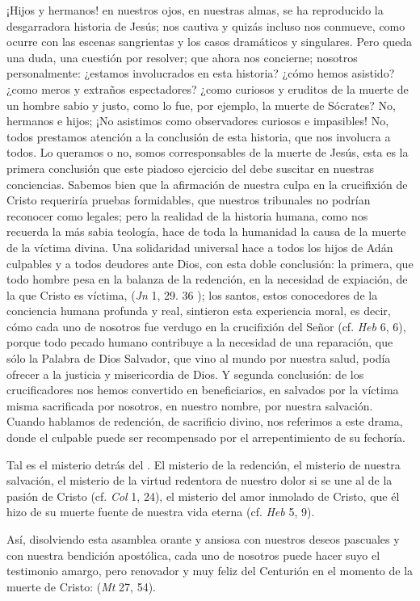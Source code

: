 \begin{body}
¡Hijos y hermanos! en nuestros ojos, en nuestras almas, se ha reproducido la desgarradora historia de Jesús; nos cautiva y quizás incluso nos conmueve, como ocurre con las escenas sangrientas y los casos dramáticos y singulares. Pero queda una duda, una cuestión por resolver; que ahora nos concierne; nosotros personalmente: ¿estamos involucrados en esta historia? ¿cómo hemos asistido? ¿como meros y extraños espectadores? ¿como curiosos y eruditos de la muerte de un hombre sabio y justo, como lo fue, por ejemplo, la muerte de Sócrates? No, hermanos e hijos; ¡No asistimos como observadores curiosos e impasibles! No, todos prestamos atención a la conclusión de esta historia, que nos involucra a todos. Lo queramos o no, somos corresponsables de la muerte de Jesús, esta es la primera conclusión que este piadoso ejercicio del  debe suscitar en nuestras conciencias. Sabemos bien que la afirmación de nuestra culpa en la crucifixión de Cristo requeriría pruebas formidables, que nuestros tribunales no podrían reconocer como legales; pero la realidad de la historia humana, como nos recuerda la más sabia teología, hace de toda la humanidad la causa de la muerte de la víctima divina. Una solidaridad universal hace a todos los hijos de Adán culpables y a todos deudores ante Dios, con esta doble conclusión: la primera, que todo hombre pesa en la balanza de la redención, en la necesidad de expiación, de la que Cristo es víctima,  (\textit{Jn} 1, 29. 36 ); los santos, estos conocedores de la conciencia humana profunda y real, sintieron esta experiencia moral, es decir, cómo cada uno de nosotros fue verdugo en la crucifixión del Señor (cf. \textit{Heb} 6, 6), porque todo pecado humano contribuye a la necesidad de una reparación, que sólo la Palabra de Dios Salvador, que vino al mundo por nuestra salud, podía ofrecer a la justicia y misericordia de Dios. Y segunda conclusión: de los crucificadores nos hemos convertido en beneficiarios, en salvados por la víctima misma sacrificada por nosotros, en nuestro nombre, por nuestra salvación. Cuando hablamos de redención, de sacrificio divino, nos referimos a este drama, donde el culpable puede ser recompensado por el arrepentimiento de su fechoría.

Tal es el misterio detrás del . El misterio de la redención, el misterio de nuestra salvación, el misterio de la virtud redentora de nuestro dolor si se une al de la pasión de Cristo (cf. \textit{Col} 1, 24), el misterio del amor inmolado de Cristo, que él hizo de su muerte fuente de nuestra vida eterna (cf. \textit{Heb} 5, 9).

Así, disolviendo esta asamblea orante y ansiosa con nuestros deseos pascuales y con nuestra bendición apostólica, cada uno de nosotros puede hacer suyo el testimonio amargo, pero renovador y muy feliz del Centurión en el momento de la muerte de Cristo:  (\textit{Mt} 27, 54).
\end{body}


